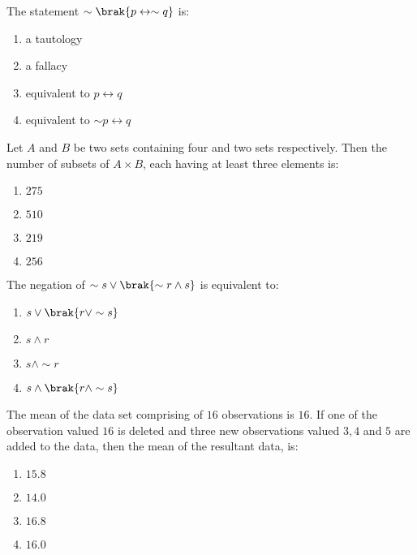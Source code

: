 \iffalse
\title{CHAPTER 22- MISCELLANEOUS}
\author{EE24BTECH11021 - Eshan Ray}
\section{mains}
\fi
    \setcounter{enumi}{60}
    \item The statement $\sim\brak{p\leftrightarrow \sim q}$ is:     \hfill{}
    \begin{enumerate}
    \item a tautology
    \item a fallacy
    \item equivalent to $p \leftrightarrow q$
    \item equivalent to $\sim p \leftrightarrow q$
    \end{enumerate}
    \item Let $A$ and $B$ be two sets containing four and two sets respectively. Then the number of subsets of $A \times B$, each having at least three elements is: \hfill{}
    \begin{enumerate}
    \item $275$
    \item $510$
    \item $219$
    \item $256$
     \end{enumerate}
    \item The negation of $\sim s\vee\brak{\sim r\wedge s}$ is equivalent to: \hfill{}
    \begin{enumerate}
        \item $s\vee\brak{r\vee\sim s}$
        \item $s\wedge r$
        \item $s\wedge \sim r$
        \item $s\wedge\brak{r\wedge \sim s}$ 
    \end{enumerate}
    \item The mean of the data set comprising of $16$ observations is $16$. If one of the observation valued $16$ is deleted and three new observations valued $3, 4$ and $5$ are added to the data, then the mean of the resultant data, is: \hfill{}
        \begin{enumerate}
            \item $15.8$
            \item $14.0$
            \item $16.8$
            \item $16.0$ 
            \end{enumerate}
